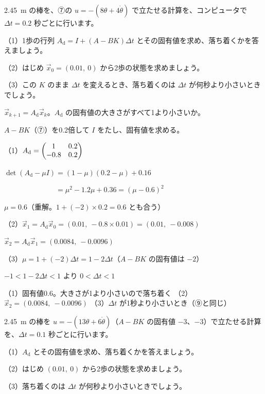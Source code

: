 \begin{reidai}[コンピュータのくり返し]
\qty{2.45}{m} の棒を、⑦の $u=-(8\theta+4\dot\theta)$ で立たせる計算を、コンピュータで $\Delta t=0.2$ 秒ごとに行います。\par
（1）1歩の行列 $A_{\mathrm d}=I+(A-BK)\Delta t$ とその固有値を求め、落ち着くかを答えましょう。\par
（2）はじめ $\vec x_0=(0.01,\ 0)$ から2歩の状態を求めましょう。\par
（3）この $K$ のまま $\Delta t$ を変えるとき、落ち着くのは $\Delta t$ が何秒より小さいときでしょう。\par
\kangaekata {}\par
{}\enspace $\vec x_{k+1}=A_{\mathrm d}\vec x_k$。$A_{\mathrm d}$ の固有値の大きさがすべて1より小さいか。\par
{}\enspace $A-BK$（⑦）を0.2倍して $I$ をたし、固有値を求める。\par
\shiki\kixks{}\zw{} （1）$A_{\mathrm d}=\kixkpm{1&0.2\\-0.8&0.2}$\par
\kixkb $\det(A_{\mathrm d}-\mu I)=(1-\mu)(0.2-\mu)+0.16$\par
\kixkb $\phantom{\det(A_{\mathrm d}-\mu I)}=\mu^2-1.2\mu+0.36=(\mu-0.6)^2$\par
\kixkb $\mu=0.6$（重解。$1+(-2)\times0.2=0.6$ とも合う）\par
\kixka （2）$\vec x_1=A_{\mathrm d}\vec x_0=(0.01,\ -0.8\times0.01)=(0.01,\ -0.008)$\par
\kixkb $\vec x_2=A_{\mathrm d}\vec x_1=(0.0084,\ -0.0096)$\par
\kixka （3）$\mu=1+(-2)\Delta t=1-2\Delta t$（$A-BK$ の固有値は $-2$）\par
\kixkb $-1<1-2\Delta t<1$ より $0<\Delta t<1$\par
\kotae （1）固有値0.6。大きさが1より小さいので落ち着く
\kixka （2）$\vec x_2=(0.0084,\ -0.0096)$
\kixka （3）$\Delta t$ が1秒より小さいとき（⑨と同じ）
\end{reidai}

\begin{jibun}
\qty{2.45}{m} の棒を $u=-(13\theta+6\dot\theta)$（$A-BK$ の固有値 $-3$、$-3$）で立たせる計算を、$\Delta t=0.1$ 秒ごとに行います。\par
（1）$A_{\mathrm d}$ とその固有値を求め、落ち着くかを答えましょう。\par
（2）はじめ $(0.01,\ 0)$ から2歩の状態を求めましょう。\par
（3）落ち着くのは $\Delta t$ が何秒より小さいときでしょう。
\end{jibun}

